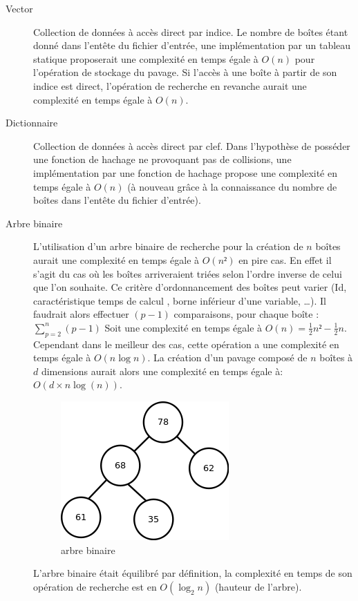 \begin{description}
 \item[Vector] Collection de données à accès direct par indice. Le nombre de boîtes étant donné dans l'entête du fichier d'entrée, une implémentation par un tableau statique proposerait une complexité en temps égale à $O(n)$ pour l'opération de stockage du pavage. Si l'accès à une boîte à partir de son indice est direct, l'opération de recherche en revanche aurait une complexité en temps égale à $O(n)$. 

\item[Dictionnaire]
Collection de données à accès direct par clef. Dans l'hypothèse de posséder une fonction de hachage ne provoquant pas de collisions, une implémentation par une fonction de hachage propose une complexité en temps égale à $O(n)$ (à nouveau grâce à la connaissance du nombre de boîtes dans l'entête du fichier d'entrée).


\item[Arbre binaire]
L'utilisation d'un arbre binaire de recherche pour la création de $n$ boîtes aurait une complexité en temps égale à $O(n²)$ en pire cas. En effet il s'agit du cas où les boîtes arriveraient triées selon l'ordre inverse de celui que l'on souhaite. Ce critère d'ordonnancement des boîtes peut varier (Id, caractéristique \og temps de calcul \fg{}, borne inférieur d'une variable, \dots{}). Il faudrait alors effectuer $(p-1)$ comparaisons, pour chaque boîte :  $\sum_{p=2}^{n}(p-1)$  Soit une complexité en temps égale à $O(n)=\frac{1}{2}n²-\frac{1}{2}n$. Cependant dans le meilleur des cas, cette opération a une complexité en temps égale à $O(n\log{n})$. La création d'un pavage composé de $n$ boîtes à $d$ dimensions aurait alors une complexité en temps égale à: $O(d \times n\log(n))$.

\begin{figure}[htbp]
  \centering
  \includegraphics[scale=0.60]{img/binTree}
  \caption{arbre binaire}
  \label{fig:ab}
\end{figure}
L'arbre binaire était équilibré par définition, la complexité en temps de son opération de recherche est en $O(\log_2{n})$ (hauteur de l'arbre).
   



\end{description}
